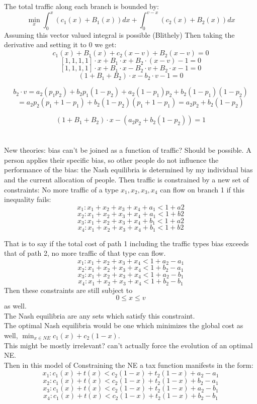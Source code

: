 \documentclass[12pt]{article}
\begin{document}
The total traffic along each branch is bounded by:
\[\min_x \int_0^x (c_1(x) +B_1(x))dx +  \int_0^{v-x}(c_2(x) +B_2(x))dx\]
Assuming this vector valued integral is possible (Blithely) Then taking the derivative and setting it to 0 we get:
\[ c_1(x) +B_1(x) + c_2(x-v) +B_2(x-v) = 0 \]
\[  [1,1,1,1] \cdot x + B_1 \cdot x  +B_2\cdot (x-v) -1 =0\]
\[  [1,1,1,1] \cdot x + B_1 \cdot x  -B_2\cdot v +B_2 \cdot x -1 =0\]
\[  (1+ B_1 +B_2) \cdot x - b_2\cdot v -1 =0\]

\[b_2 \cdot v = a_2(p_1p_2)+ b_2p_1(1-p_2)+a_2(1-p_1)p_2 + b_2(1-p_1)(1-p_2) \]\[= a_2p_2(p_1+1-p_1) +b_2(1-p_2)(p_1+1-p_1) = a_2p_2 +b_2(1-p_2)\]

\[  (1+ B_1 +B_2) \cdot x -( a_2p_2 +b_2(1-p_2)) = 1\]
\section{}
New theories: bias can't be joined as a function of traffic? Should be possible. A person applies their specific bias, so other people do not influence the performance of the bias: the Nash equilibria is determined by my individual bias  and the current allocation of people. Then traffic is constrained by a new set of constraints:
No more traffic of a type $x_1,x_2,x_3,x_4$ can flow on branch 1 if this inequality fails:
 \[x_1: x_1+x_2+x_3+x_4 + a_1  < 1+a2 \]
 \[x_2:x_1+x_2+x_3+x_4+ a_1  < 1+b2 \]
 \[x_3: x_1+x_2+x_3+x_4 + b_1  < 1+a2 \]
 \[x_4: x_1+x_2+x_3+x_4 + b_1  < 1+b2 \]
 
That is to say if the total cost of path 1 including the traffic types bias exceeds that of path 2, no more traffic of that type can flow.\\
 \[x_1: x_1+x_2+x_3+x_4   < 1+a_2 -a_1 \]
 \[x_2:x_1+x_2+x_3+x_4  < 1+b_2 -a_1 \]
 \[x_3: x_1+x_2+x_3+x_4  < 1+a_2-b_1 \]
 \[x_4: x_1+x_2+x_3+x_4  < 1+b_2 -b_1 \]
Then these constraints are still subject to \[0 \leq x \leq v\] as well.\\
 The Nash equilibria are any sets which satisfy this constraint.\\
 The optimal Nash equilibria would be one which minimizes the global cost as well, $\min_{x\in NE} c_1(x) + c_2(1-x)$.\\ This might be mostly irrelevant? can't actually force the evolution of an optimal NE.\\
 Then in this model of Constraining the NE a tax function manifests in the form:
 \[x_1: c_1(x) +t(x)   < c_2(1-x)+t_2(1-x)+a_2 -a_1 \]
 \[x_2:c_1(x)+t(x) < c_2(1-x)+t_2(1-x)+b_2 -a_1 \]
 \[x_3: c_1(x)+t(x)  < c_2(1-x)+t_2(1-x)+a_2-b_1 \]
 \[x_4: c_1(x)+t(x)  < c_2(1-x)+t_2(1-x)+b_2 -b_1 \]
 
\end{document}
